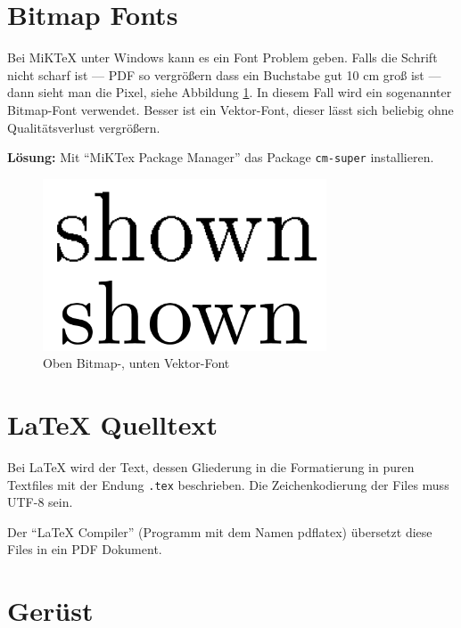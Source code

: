\section{Bitmap Fonts}


Bei MiKTeX unter Windows kann es ein Font Problem geben.
Falls die Schrift nicht scharf ist --- PDF so vergrößern dass ein Buchstabe gut 10 cm groß ist --- dann sieht man die Pixel, siehe Abbildung \ref{fig:bitmapfont}.
In diesem Fall wird ein sogenannter Bitmap-Font verwendet. 
Besser ist ein Vektor-Font, dieser lässt sich beliebig ohne Qualitätsverlust vergrößern.

\textbf{Lösung:}
Mit "`MiKTex Package Manager"' das Package \verb+cm-super+ installieren.

\begin{figure}[H]
	\centering
	\includegraphics[width=0.75\textwidth]{./media/images/bitmap_font}
  	\caption{Oben Bitmap-, unten Vektor-Font}
  	\label{fig:bitmapfont}
\end{figure}

\section{LaTeX Quelltext}

Bei LaTeX wird der Text, dessen Gliederung in die Formatierung in puren Textfiles mit der Endung \verb+.tex+ beschrieben.
Die Zeichenkodierung der Files muss UTF-8 sein.

Der "`LaTeX Compiler"' (Programm mit dem Namen pdflatex) übersetzt diese Files in ein PDF Dokument.

\section{Gerüst}

